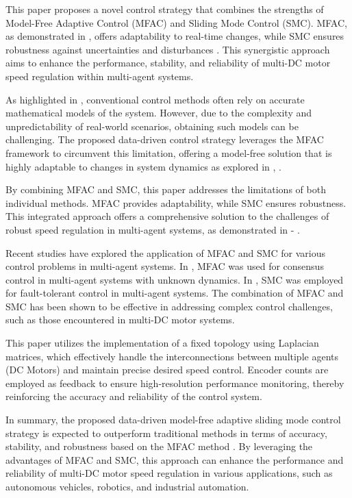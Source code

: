 \documentclass[journal,onecolumn]{IEEEtran}
\begin{document}
This paper proposes a novel control strategy that combines the strengths of Model-Free Adaptive Control (MFAC) and Sliding Mode Control (SMC). MFAC, as demonstrated in \cite{2}, offers adaptability to real-time changes, while SMC ensures robustness against uncertainties and disturbances \cite{13}. This synergistic approach aims to enhance the performance, stability, and reliability of multi-DC motor speed regulation within multi-agent systems.

As highlighted in \cite{3}, conventional control methods often rely on accurate mathematical models of the system. However, due to the complexity and unpredictability of real-world scenarios, obtaining such models can be challenging. The proposed data-driven control strategy leverages the MFAC framework to circumvent this limitation, offering a model-free solution that is highly adaptable to changes in system dynamics as explored in \cite{4} , \cite{6}.

By combining MFAC and SMC, this paper addresses the limitations of both individual methods. MFAC provides adaptability, while SMC ensures robustness. This integrated approach offers a comprehensive solution to the challenges of robust speed regulation in multi-agent systems, as demonstrated in \cite{7} - \cite{11}.

Recent studies have explored the application of MFAC and SMC for various control problems in multi-agent systems. In \cite{1}, MFAC was used for consensus control in multi-agent systems with unknown dynamics. In \cite{5}, SMC was employed for fault-tolerant control in multi-agent systems. The combination of MFAC and SMC has been shown to be effective in addressing complex control challenges, such as those encountered in multi-DC motor systems.

This paper utilizes the implementation of a fixed topology using Laplacian matrices, which effectively handle the interconnections between multiple agents (DC Motors) and maintain precise desired speed control. Encoder counts are employed as feedback to ensure high-resolution performance monitoring, thereby reinforcing the accuracy and reliability of the control system.

In summary, the proposed data-driven model-free adaptive sliding mode control strategy is expected to outperform traditional methods in terms of accuracy, stability, and robustness based on the MFAC method \cite{2}. By leveraging the advantages of MFAC and SMC, this approach can enhance the performance and reliability of multi-DC motor speed regulation in various applications, such as autonomous vehicles, robotics, and industrial automation.
\end{document}
